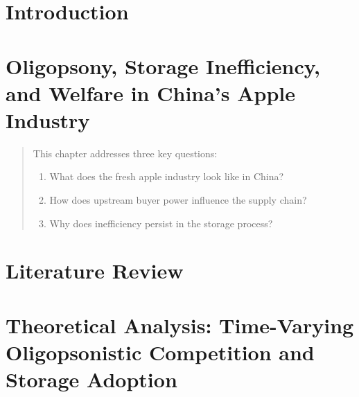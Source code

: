 \documentclass[12pt,authoryear, notitlepage]{elegantpaper}
\begin{document}

\clearpage
{}

\newpage
\chapter{Introduction} \label{Chapter: introduction}
    



\newpage
\chapter{Oligopsony, Storage Inefficiency, and Welfare in China's Apple Industry}
\label{Chapter: descriptive chapter}

\begin{abstract}
This chapter addresses three key questions:
\begin{enumerate}
    \item What does the fresh apple industry look like in China?
    \item How does upstream buyer power influence the supply chain?
    \item Why does inefficiency persist in the storage process?
\end{enumerate}
\end{abstract}

    



\newpage
\chapter{Literature Review}

    


\newpage
\chapter{Theoretical Analysis: Time-Varying Oligopsonistic Competition and Storage Adoption}
\end{document}
